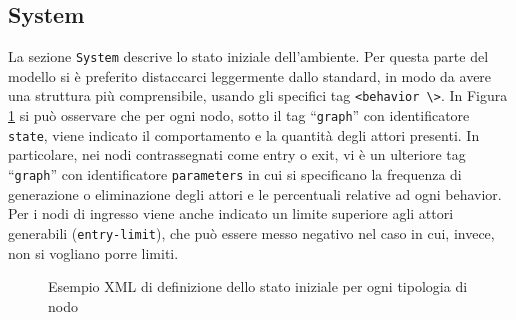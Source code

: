\subsection{System}

La sezione \texttt{System} descrive lo stato iniziale dell'ambiente. Per questa parte del modello si è preferito distaccarci leggermente dallo standard, in modo da avere una struttura più comprensibile, usando gli specifici tag \texttt{<behavior \textbackslash>}. In Figura \ref{fig:xml-system} si può osservare che per ogni nodo, sotto il tag “\texttt{graph}” con identificatore \texttt{state}, viene indicato il comportamento e la quantità degli attori presenti. In particolare, nei nodi contrassegnati come entry o exit, vi è un ulteriore tag “\texttt{graph}” con identificatore \texttt{parameters} in cui si specificano la frequenza di generazione o eliminazione degli attori e le percentuali relative ad ogni behavior. Per i nodi di ingresso viene anche indicato un limite superiore agli attori generabili (\texttt{entry-limit}), che può essere messo negativo nel caso in cui, invece, non si vogliano porre limiti.

\begin{figure}[htbp]
\centering
\caption{Esempio XML di definizione dello stato iniziale per ogni tipologia di nodo}
\label{fig:xml-system}
\end{figure}

%
%
%
%
%
%

